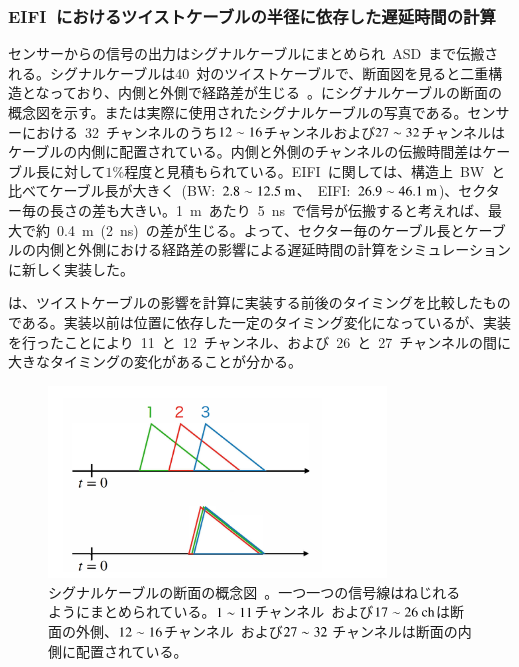 \subsubsection{EIFI~におけるツイストケーブルの半径に依存した遅延時間の計算}
センサーからの信号の出力はシグナルケーブルにまとめられ~ASD~まで伝搬される。シグナルケーブルは40~対のツイストケーブルで、断面図を見ると二重構造となっており、内側と外側で経路差が生じる~\cite{MT:04}。にシグナルケーブルの断面の概念図を示す。または実際に使用されたシグナルケーブルの写真である。センサーにおける~32~チャンネルのうち$\rm{12\sim16}$チャンネルおよび$\rm{27\sim32}$チャンネルはケーブルの内側に配置されている。内側と外側のチャンネルの伝搬時間差はケーブル長に対して$1\%$程度と見積もられている。EIFI~に関しては、構造上~BW~と比べてケーブル長が大きく~(BW:~$\rm{2.8\sim12.5~m}$、~EIFI:~$\rm{26.9\sim46.1~m}$)、セクター毎の長さの差も大きい。1~m~あたり~5~ns~で信号が伝搬すると考えれば、最大で約~0.4~m~(2~ns)~の差が生じる。よって、セクター毎のケーブル長とケーブルの内側と外側における経路差の影響による遅延時間の計算をシミュレーションに新しく実装した。

は、ツイストケーブルの影響を計算に実装する前後のタイミングを比較したものである。実装以前は位置に依存した一定のタイミング変化になっているが、実装を行ったことにより~11~と~12~チャンネル、および~26~と~27~チャンネルの間に大きなタイミングの変化があることが分かる。

\begin{figure}[H]
    \centering   
    \includegraphics[width=0.8\textwidth,page=6]{img/slide/slide.pdf}
    \caption[シグナルケーブルの断面の概念図]{シグナルケーブルの断面の概念図~\cite{MT:04}。一つ一つの信号線はねじれるようにまとめられている。$\rm{1\sim11}$チャンネル~および$\rm{17\sim26~ch}$は断面の外側、$\rm{12\sim16}$チャンネル~および$\rm{27\sim32~}$チャンネルは断面の内側に配置されている。}
    \label{fig:twist0}
\end{figure}


